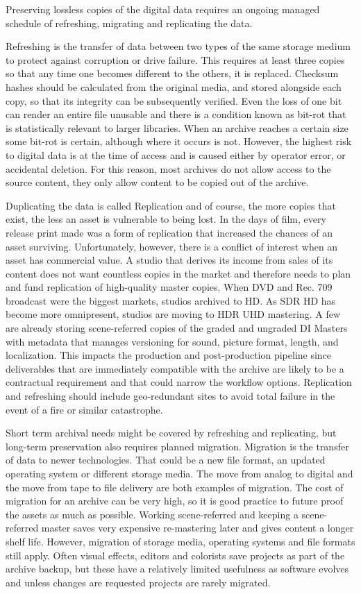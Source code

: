Preserving lossless copies of the digital data requires an ongoing managed schedule of refreshing, migrating and replicating the data. 

Refreshing is the transfer of data between two types of the same storage medium to protect against corruption or drive failure. This requires at least three copies so that any time one becomes different to the others, it is replaced. Checksum hashes should be calculated from the original media, and stored alongside each copy, so that its integrity can be subsequently verified. Even the loss of one bit can render an entire file unusable and there is a condition known as bit-rot that is statistically relevant to larger libraries. When an archive reaches a certain size some bit-rot is certain, although where it occurs is not. However, the highest risk to digital data is at the time of access and is caused either by operator error, or accidental deletion. For this reason, most archives do not allow access to the source content, they only allow content to be copied out of the archive. 

Duplicating the data is called Replication and of course, the more copies that exist, the less an asset is vulnerable to being lost. In the days of film, every release print made was a form of replication that increased the chances of an asset surviving. Unfortunately, however, there is a conflict of interest when an asset has commercial value. A studio that derives its income from sales of its content does not want countless copies in the market and therefore needs to plan and fund replication of high-quality master copies. When DVD and Rec. 709 broadcast were the biggest markets, studios archived to HD. As SDR HD has become more omnipresent, studios are moving to HDR UHD mastering. A few are already storing scene-referred copies of the graded and ungraded DI Masters with metadata that manages versioning for sound, picture format, length, and localization. This impacts the production and post-production pipeline since deliverables that are immediately compatible with the archive are likely to be a contractual requirement and that could narrow the workflow options. Replication and refreshing should include geo-redundant sites to avoid total failure in the event of a fire or similar catastrophe.

Short term archival needs might be covered by refreshing and replicating, but long-term preservation also requires planned migration. Migration is the transfer of data to newer technologies. That could be a new file format, an updated operating system or different storage media.  The move from analog to digital and the move from tape to file delivery are both examples of migration. The cost of migration for an archive can be very high, so it is good practice to future proof the assets as much as possible. Working scene-referred and keeping a scene-referred master saves very expensive re-mastering later and gives content a longer shelf life. However, migration of storage media, operating systems and file formats still apply. Often visual effects, editors and colorists save projects as part of the archive backup, but these have a relatively limited usefulness as software evolves and unless changes are requested projects are rarely migrated.

